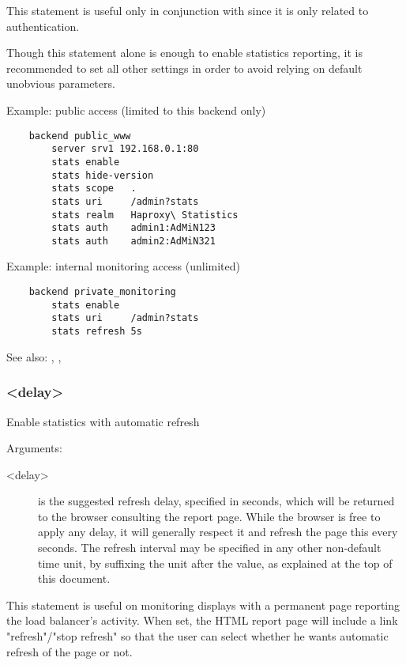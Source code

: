 {  This statement is useful only in conjunction with  since it is
  only related to authentication.

  Though this statement alone is enough to enable statistics reporting, it is
  recommended to set all other settings in order to avoid relying on default
  unobvious parameters.

  Example: public access (limited to this backend only)
  \begin{verbatim}
    backend public_www
        server srv1 192.168.0.1:80
        stats enable
        stats hide-version
        stats scope   .
        stats uri     /admin?stats
        stats realm   Haproxy\ Statistics
        stats auth    admin1:AdMiN123
        stats auth    admin2:AdMiN321
   \end{verbatim}

   Example: internal monitoring access (unlimited)
   \begin{verbatim}
    backend private_monitoring
        stats enable
        stats uri     /admin?stats
        stats refresh 5s
   \end{verbatim}

  See also: , , 

\subsubsection[stats refresh]{ <delay>}

  Enable statistics with automatic refresh


  Arguments:
  \begin{description}
  \item[<delay>] is the suggested refresh delay, specified in seconds, which will
              be returned to the browser consulting the report page. While the
              browser is free to apply any delay, it will generally respect it
              and refresh the page this every seconds. The refresh interval may
              be specified in any other non-default time unit, by suffixing the
              unit after the value, as explained at the top of this document.
  \end{description}

  This statement is useful on monitoring displays with a permanent page
  reporting the load balancer's activity. When set, the HTML report page will
  include a link "refresh"/"stop refresh" so that the user can select whether
  he wants automatic refresh of the page or not.

}
